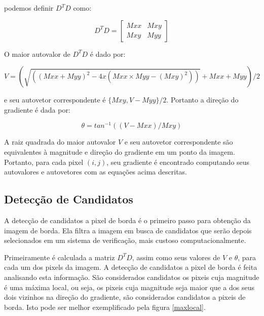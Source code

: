 podemos definir $D^TD$ como:

$$ D^T D = \begin{bmatrix} Mxx & Mxy \\ Mxy & Myy \end{bmatrix}$$


O maior autovalor de $D^TD$ é dado por:

$$ V = (\sqrt{( (Mxx+Myy)^2 - 4 x(Mxx \times Myy - (Mxy)^2 ) )}+Mxx+ Myy)/2 $$

e seu autovetor correspondente é $ \{Mxy,V-Myy\}/2 $. Portanto a direção do gradiente é dada por:

$$ \theta = tan^{-1}((V-Mxx)/Mxy) $$

A raiz quadrada do maior autovalor $V$ e seu autovetor correspondente são equivalentes à magnitude e direção do gradiente em um ponto da imagem. Portanto, para cada pixel $(i,j)$, seu gradiente é encontrado computando seus autovalores e autovetores com as equações acima descritas.



\subsection{Detecção de Candidatos}


A detecção de candidatos a pixel de borda é o primeiro passo para obtenção da imagem de borda. Ela filtra a imagem em busca de candidatos que serão depois selecionados em um sistema de verificação, mais custoso computacionalmente.

Primeiramente é calculada a matriz $D^TD$, assim como seus valores de $V$ e $\theta$, para cada um dos pixels da imagem. A detecção de candidatos a pixel de borda é feita analisando esta informação. São considerados candidatos os pixeis cuja magnitude é uma máxima local, ou seja, os pixeis cuja magnitude seja maior que a dos seus dois vizinhos na direção do gradiente, são considerados candidatos a pixeis de borda. Isto pode ser melhor exemplificado pela figura \ref{maxlocal}.

